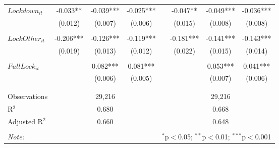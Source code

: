 \begin{tabular}{@{\extracolsep{-2pt}}lccccccc}
$Lockdown_{it}$     & -0.033**  & -0.039*** & -0.025*** && -0.047**  & -0.049*** & -0.036*** \\
                    &  (0.012)  &  (0.007)  &  (0.006)  &&  (0.015)  &  (0.008)  &  (0.008)  \\
                    &           &           &           &&           &           &           \\[-2.1ex]
$LockOther_{it}$    & -0.206*** & -0.126*** & -0.119*** && -0.181*** & -0.141*** & -0.143*** \\
                    &  (0.019)  &  (0.013)  &  (0.012)  &&  (0.022)  &  (0.015)  &  (0.014)  \\
                    &           &           &           &&           &           &           \\[-2.1ex]
$FullLock_{it}$     &           &  0.082*** &  0.081*** &&           &  0.053*** &  0.041*** \\
                    &           &   (0.006) &   (0.005) &&           &   (0.007) &   (0.006) \\
                    &           &           &           &&           &           &           \\[-2.1ex]
\hline \\[-1.8ex] 
Observations     & \multicolumn{3}{c}{29,216}  && \multicolumn{3}{c}{29,216}  \\ 
R$^{2}$          & \multicolumn{3}{c}{ 0.680}  && \multicolumn{3}{c}{ 0.668}  \\ 
Adjusted R$^{2}$ & \multicolumn{3}{c}{ 0.660}  && \multicolumn{3}{c}{ 0.648}  \\ 
\hline 
\hline \\[-1.8ex] 
\textit{Note:}  & \multicolumn{7}{r}{$^{*}$p$<$0.05; $^{**}$p$<$0.01; $^{***}$p$<$0.001} \\ 
\end{tabular} 


% 

